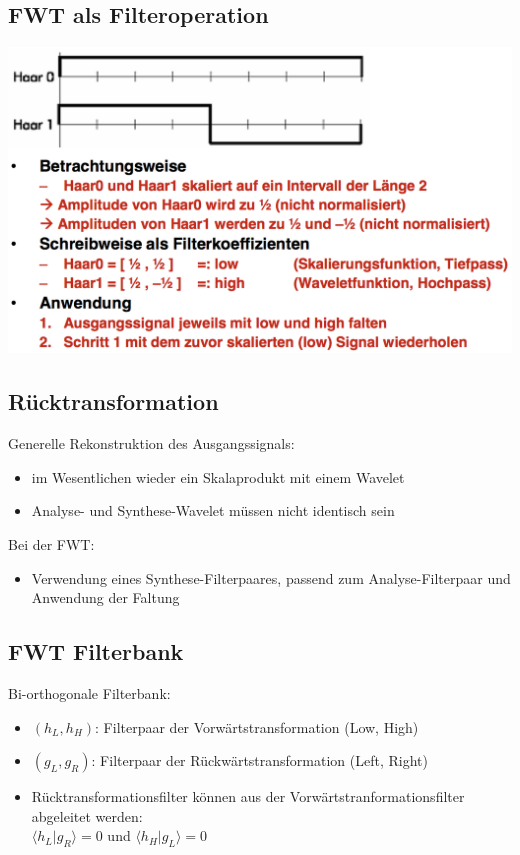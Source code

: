 \documentclass[10pt]{article}
\begin{document}
\subsection{FWT als Filteroperation}
\begin{center}
	\includegraphics[scale=0.3]{fwt-filter.png}
\end{center}

\subsection{Rücktransformation}
Generelle Rekonstruktion des Ausgangssignals:
\begin{itemize}
	\item im Wesentlichen wieder ein Skalaprodukt mit einem Wavelet
	\item Analyse- und Synthese-Wavelet müssen nicht identisch sein
\end{itemize}
Bei der FWT:
\begin{itemize}
	\item Verwendung eines Synthese-Filterpaares, passend zum Analyse-Filterpaar und Anwendung der Faltung
\end{itemize}

\subsection{FWT Filterbank}
Bi-orthogonale Filterbank:
\begin{itemize}
	\item $(h_L, h_H)$: Filterpaar der Vorwärtstransformation (Low, High)
	\item $(g_L, g_R)$: Filterpaar der Rückwärtstransformation (Left, Right)
	\item Rücktransformationsfilter können aus der Vorwärtstranformationsfilter abgeleitet werden: \\
		$\langle h_L | g_R \rangle = 0$ und $\langle h_H | g_L \rangle = 0$
\end{itemize}
\end{document}
